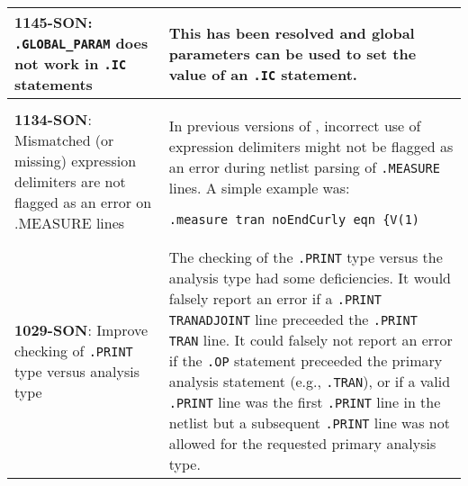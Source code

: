 {\begin{longtable}[h] {>{\raggedright\small}m{2in}|>{\raggedright\let\\\tabularnewline\small}m{3.5in}}
  \textbf{1145-SON}: \texttt{.GLOBAL\_PARAM} does not work
in \texttt{.IC} statements & This has been resolved and global
parameters can be used to set the value of an \texttt{.IC}
statement.\\ \hline

  \textbf{1134-SON}: Mismatched (or missing) expression delimiters
are not flagged as an error on .MEASURE lines & In previous versions
of \Xyce{}, incorrect use of expression delimiters might not be
flagged as an error during netlist parsing of \texttt{.MEASURE}
lines.  A simple example was:
\begin{verbatim}
.measure tran noEndCurly eqn {V(1)
\end{verbatim}
\\ \hline

  \textbf{1029-SON}: Improve checking of \texttt{.PRINT} type versus
analysis type & The checking of the \texttt{.PRINT} type versus the
analysis type had some deficiencies. It would falsely report an error
if a \texttt{.PRINT TRANADJOINT} line preceeded the \texttt{.PRINT
TRAN} line.  It could falsely not report an error if the \texttt{.OP}
statement preceeded the primary analysis statement (e.g.,
\texttt{.TRAN}), or if a valid \texttt{.PRINT} line was the first \texttt{.PRINT}
line in the netlist but a subsequent \texttt{.PRINT} line was not allowed
for the requested primary analysis type. \\ \hline

\end{longtable}
}
